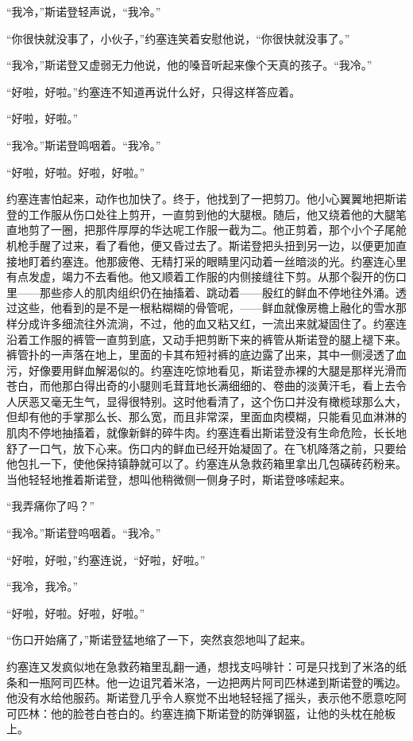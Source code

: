     “我冷，”斯诺登轻声说，“我冷。”

    “你很快就没事了，小伙子，”约塞连笑着安慰他说，“你很快就没事了。”

    “我冷，”斯诺登又虚弱无力他说，他的嗓音听起来像个天真的孩子。“我冷。”

    “好啦，好啦。”约塞连不知道再说什么好，只得这样答应着。

    “好啦，好啦。”

    “我冷。”斯诺登鸣咽着。“我冷。”

    “好啦，好啦。好啦，好啦。”

    约塞连害怕起来，动作也加快了。终于，他找到了一把剪刀。他小心翼翼地把斯诺登的工作服从伤口处往上剪开，一直剪到他的大腿根。随后，他又绕着他的大腿笔直地剪了一圈，把那件厚厚的华达呢工作服一截为二。他正剪着，那个小个子尾舱机枪手醒了过来，看了看他，便又昏过去了。斯诺登把头扭到另一边，以便更加直接地盯着约塞连。他那疲倦、无精打采的眼睛里闪动着一丝暗淡的光。约塞连心里有点发虚，竭力不去看他。他又顺着工作服的内侧接缝往下剪。从那个裂开的伤口里——那些疹人的肌肉组织仍在抽搐着、跳动着——殷红的鲜血不停地往外涌。透过这些，他看到的是不是一根粘糊糊的骨管呢，——鲜血就像房檐上融化的雪水那样分成许多细流往外流淌，不过，他的血又粘又红，一流出来就凝固住了。约塞连沿着工作服的裤管一直剪到底，又动手把剪断下来的裤管从斯诺登的腿上褪下来。裤管扑的一声落在地上，里面的卡其布短衬裤的底边露了出来，其中一侧浸透了血污，好像要用鲜血解渴似的。约塞连吃惊地看见，斯诺登赤裸的大腿是那样光滑而苍白，而他那白得出奇的小腿则毛茸茸地长满细细的、卷曲的淡黄汗毛，看上去令人厌恶又毫无生气，显得很特别。这时他看清了，这个伤口并没有橄榄球那么大，但却有他的手掌那么长、那么宽，而且非常深，里面血肉模糊，只能看见血淋淋的肌肉不停地抽搐着，就像新鲜的碎牛肉。约塞连看出斯诺登没有生命危险，长长地舒了一口气，放下心来。伤口内的鲜血已经开始凝固了。在飞机降落之前，只要给他包扎一下，使他保持镇静就可以了。约塞连从急救药箱里拿出几包磺砖药粉来。当他轻轻地推着斯诺登，想叫他稍微侧一侧身子时，斯诺登哆嗦起来。

    “我弄痛你了吗？”

    “我冷。”斯诺登呜咽着。“我冷。”

    “好啦，好啦，”约塞连说，“好啦，好啦。”

    “我冷，我冷。”

    “好啦，好啦。好啦，好啦。”

    “伤口开始痛了，”斯诺登猛地缩了一下，突然哀怨地叫了起来。

    约塞连又发疯似地在急救药箱里乱翻一通，想找支吗啡针：可是只找到了米洛的纸条和一瓶阿司匹林。他一边诅咒着米洛，一边把两片阿司匹林递到斯诺登的嘴边。他没有水给他服药。斯诺登几乎令人察觉不出地轻轻摇了摇头，表示他不愿意吃阿可匹林：他的脸苍白苍白的。约塞连摘下斯诺登的防弹钢盔，让他的头枕在舱板上。

